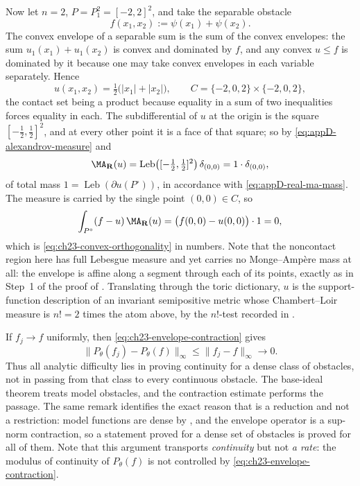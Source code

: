 \begin{example}
Now let \(n=2\), \(P=P_1^2=[-2,2]^2\), and take the separable obstacle
\[
 f(x_1,x_2):=\psi(x_1)+\psi(x_2).
\]
The convex envelope of a separable sum is the sum of the convex envelopes:
the sum \(u_1(x_1)+u_1(x_2)\) is convex and dominated by \(f\), and any
convex \(u\leq f\) is dominated by it because one may take convex envelopes
in each variable separately.  Hence
\[
 u(x_1,x_2)=\tfrac12\bigl(|x_1|+|x_2|\bigr),
 \qquad
 C=\{-2,0,2\}\times\{-2,0,2\},
\]
the contact set being a product because equality in a sum of two
inequalities forces equality in each.  The subdifferential of \(u\) at the
origin is the square \([-\tfrac12,\tfrac12]^2\), and at every other point it
is a face of that square; so by \eqref{eq:appD-alexandrov-measure} and
\[
 \MA_{\mathbf R}(u)=\operatorname{Leb}\bigl([-\tfrac12,\tfrac12]^2\bigr)
   \,\delta_{(0,0)}=1\cdot\delta_{(0,0)},
\]
of total mass \(1=\operatorname{Leb}(\partial u(P^\circ))\), in accordance
with \eqref{eq:appD-real-ma-mass}.  The measure is carried by the single
point \((0,0)\in C\), so
\[
 \int_{P^\circ}(f-u)\,\MA_{\mathbf R}(u)
 =\bigl(f(0,0)-u(0,0)\bigr)\cdot1=0 ,
\]
which is \eqref{eq:ch23-convex-orthogonality} in numbers.  Note that the
noncontact region here has full Lebesgue measure and yet carries no
Monge--Amp\`ere mass at all: the envelope is affine along a segment through
each of its points, exactly as in Step~1 of the proof of
.  Translating through the
toric dictionary, \(u\) is the support-function description of an invariant
semipositive metric whose Chambert--Loir measure is \(n!=2\) times the atom
above, by the \(n!\)-test recorded in .
\end{example}

\begin{example}
\label{ex:ch23-obstacle-stability}
If \(f_j\to f\) uniformly, then
\eqref{eq:ch23-envelope-contraction} gives
\[
                   \|P_\theta(f_j)-P_\theta(f)\|_\infty
                   \leq\|f_j-f\|_\infty\longrightarrow0.
\]
Thus all analytic difficulty lies in proving continuity for a dense class of
obstacles, not in passing from that class to every continuous obstacle.  The
base-ideal theorem treats model obstacles, and the contraction estimate
performs the passage.  The same remark identifies the exact reason that
 is a reduction and not a
restriction: model functions are dense by
, and the envelope operator is a sup-norm
contraction, so a statement proved for a dense set of obstacles is proved for
all of them.  Note that this argument transports \emph{continuity} but not
\emph{a rate}: the modulus of continuity of \(P_\theta(f)\) is not controlled
by \eqref{eq:ch23-envelope-contraction}.
\end{example}

